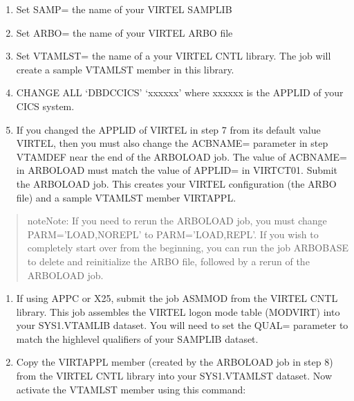 \documentclass[letterpaper,10pt,english]{sphinxmanual}
\begin{document}
\begin{enumerate}
\begin{enumerate}
\item {} 
\sphinxAtStartPar
Set SAMP= the name of your VIRTEL SAMPLIB

\item {} 
\sphinxAtStartPar
Set ARBO= the name of your VIRTEL ARBO file

\item {} 
\sphinxAtStartPar
Set VTAMLST= the name of a your VIRTEL CNTL library. The job will create a sample VTAMLST member in this library.

\item {} 
\sphinxAtStartPar
CHANGE ALL ‘DBDCCICS’ ‘xxxxxx’ where xxxxxx is the APPLID of your CICS system.

\item {} 
\sphinxAtStartPar
If you changed the APPLID of VIRTEL in step 7 from its default value VIRTEL, then you must also change the ACBNAME= parameter in step VTAMDEF near the end of the ARBOLOAD job. The value of ACBNAME= in ARBOLOAD must match the value of APPLID= in VIRTCT01. Submit the ARBOLOAD job. This creates your VIRTEL configuration (the ARBO file) and a sample VTAMLST member VIRTAPPL.

\end{enumerate}

\end{enumerate}
\begin{quote}

\begin{sphinxadmonition}{note}{Note:}
\sphinxAtStartPar
If you need to rerun the ARBOLOAD job, you must change PARM=’LOAD,NOREPL’ to PARM=’LOAD,REPL’. If you wish to completely start over from the beginning, you can run the job ARBOBASE to delete and reinitialize the ARBO file, followed by a rerun of the ARBOLOAD job.
\end{sphinxadmonition}
\end{quote}
\begin{enumerate}
%
\setcounter{enumi}{9}
\item {} 
\sphinxAtStartPar
If using APPC or X25, submit the job ASMMOD from the VIRTEL CNTL library. This job assembles the VIRTEL logon mode table (MODVIRT) into your SYS1.VTAMLIB dataset. You will need to set the QUAL= parameter to match the high\sphinxhyphen{}level qualifiers of your SAMPLIB dataset.

\item {} 
\sphinxAtStartPar
Copy the VIRTAPPL member (created by the ARBOLOAD job in step 8) from the VIRTEL CNTL library into your SYS1.VTAMLST dataset. Now activate the VTAMLST member using this command:

\end{enumerate}
\end{document}
